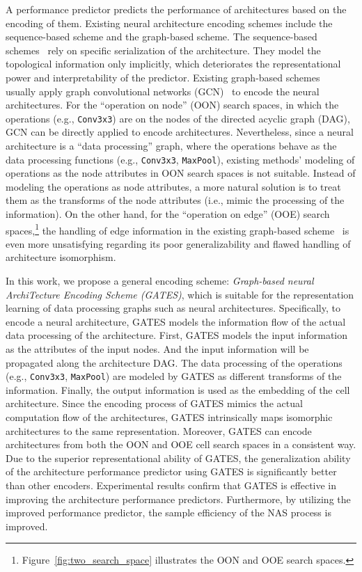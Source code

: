 \documentclass[runningheads]{llncs}
\begin{document}
A performance predictor predicts the performance of architectures based on the encoding of them. Existing neural architecture encoding schemes include the sequence-based scheme and the graph-based scheme. The sequence-based schemes~\cite{nao2018,liu2018progressive,wang2018alphax} rely on specific serialization of the architecture. They model the topological information only implicitly, which deteriorates the representational power and interpretability of the predictor.
Existing graph-based schemes~\cite{guo2019nat,shi2019multi} usually apply graph convolutional networks (GCN)~\cite{kipf2016semi} to encode the neural architectures.
For the ``operation on node'' (OON) search spaces, in which the operations (e.g., \texttt{Conv3x3}) are on the nodes of the directed acyclic graph (DAG), GCN can be directly applied to encode architectures.
Nevertheless, since a neural architecture is a ``data processing'' graph, where the operations behave as the data processing functions (e.g., \texttt{Conv3x3}, \texttt{MaxPool}), existing methods' modeling of operations as the node attributes in OON search spaces is not suitable. Instead of modeling the operations as node attributes, a more natural solution is to treat them as the transforms of the node attributes (i.e., mimic the processing of the information).
On the other hand, for the ``operation on edge'' (OOE) search spaces,\footnote{Figure~\ref{fig:two_search_space} illustrates the OON and OOE search spaces.}
the handling of edge information in the existing graph-based scheme~\cite{guo2019nat} is even more unsatisfying regarding its poor generalizability and flawed handling of architecture isomorphism. 








In this work, we propose a general encoding scheme: \emph{Graph-based neural ArchiTecture Encoding Scheme (GATES)}, which is suitable for the representation learning of data processing graphs such as neural architectures.
Specifically, to encode a neural architecture, GATES models the information flow of the actual data processing of the architecture. First, GATES models the input information as the attributes of the input nodes. And the input information will be propagated along the architecture DAG. The data processing of the operations (e.g., \texttt{Conv3x3}, \texttt{MaxPool}) are modeled by GATES as different transforms of the information. Finally, the output information is used as the embedding of the cell architecture.
Since the encoding process of GATES mimics the actual computation flow of the architectures, GATES intrinsically maps isomorphic architectures to the same representation. Moreover, GATES can encode architectures from both the OON and OOE 
cell search spaces in a consistent way.
Due to the superior representational ability of GATES, the generalization ability of the architecture performance predictor using GATES is significantly better than other encoders.
Experimental results confirm that GATES is effective in improving the architecture performance predictors. Furthermore, by utilizing the improved performance predictor, the sample efficiency of the NAS process is improved.
\end{document}
